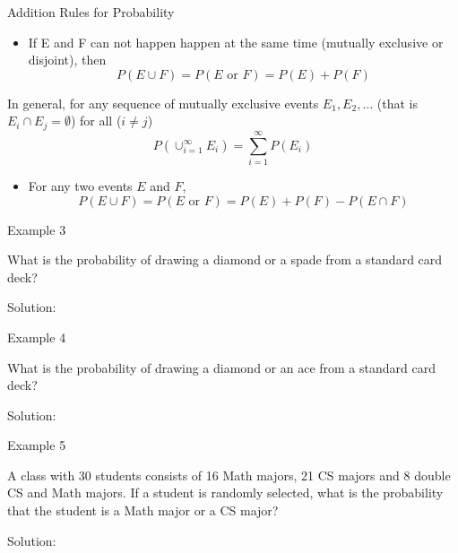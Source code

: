 \documentclass[
  ignorenonframetext,
]{beamer}
\providecommand{\tightlist}{%
  \setlength{\itemsep}{0pt}\setlength{\parskip}{0pt}}
\begin{document}
\begin{frame}{Addition Rules for Probability}
\protect\hypertarget{addition-rules-for-probability}{}
\begin{itemize}
\tightlist
\item
  If E and F can not happen happen at the same time (mutually exclusive
  or disjoint), then \[P(E \cup F)=P(E \text{ or } F) = P(E)+ P(F)\]
\end{itemize}

In general, for any sequence of mutually exclusive events
\(E_1, E_2, \ldots\) (that is \(E_i \cap E_j = \emptyset\)) for all
(\(i\neq j\))
\[P\left(\cup_{i=1}^{\infty} E_i\right)=\sum_{i=1}^{\infty} P(E_i)\]

\begin{itemize}
\tightlist
\item
  For any two events \(E\) and \(F\),
  \[P(E \cup F)=P(E \text{ or } F)=P(E)+ P(F)-P(E\cap F)\]
\end{itemize}
\end{frame}

\begin{frame}{Example 3}
\protect\hypertarget{example-3}{}
\begin{tcolorbox}
What is the probability of drawing a diamond or a spade from a standard card deck?
\end{tcolorbox}

\begin{tcolorbox}
Solution:

\vspace{30mm}
\end{tcolorbox}
\end{frame}

\begin{frame}{Example 4}
\protect\hypertarget{example-4}{}
\begin{tcolorbox}
What is the probability of drawing a diamond or an ace from a standard card deck?
\end{tcolorbox}

\begin{tcolorbox}
Solution:

\vspace{30mm}
\end{tcolorbox}
\end{frame}

\begin{frame}{Example 5}
\protect\hypertarget{example-5}{}
\begin{tcolorbox}
A class with 30 students consists of 16 Math majors, 21 CS majors and 8 double CS and Math majors. If a student is randomly selected, what is the probability that the student is a Math major or a CS major?
\end{tcolorbox}

\begin{tcolorbox}
Solution:

\vspace{30mm}
\end{tcolorbox}
\end{frame}
\end{document}
